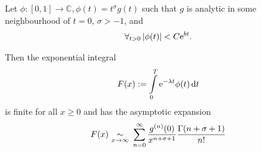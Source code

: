 Let $\phi\colon [0,1] \to \mathbb{C}, \phi(t) = t^\sigma g(t)$ such that $g$ is
analytic in some neighbourhood of $t=0$, $\sigma > -1$, and
\begin{align*}
    \forall_{t > 0} \left|\phi(t)\right| < C \Eto{bt}.
\end{align*}

Then the exponential integral
\begin{align*}
    F(x) := \Integ[T]{0}{t}{\Eto{-\lambda t}\phi(t)}
\end{align*}
is finite for all $x \geq 0$ and has the asymptotic expansion
\begin{align*}
    F(x)\ \SimAs{x\to\infty}\ \sum_{n=0}^{\infty}
    \frac{g^{(n)}(0)}{x^{n+\sigma+1}} \frac{\Gamma(n+\sigma+1)}{n!}
\end{align*}
